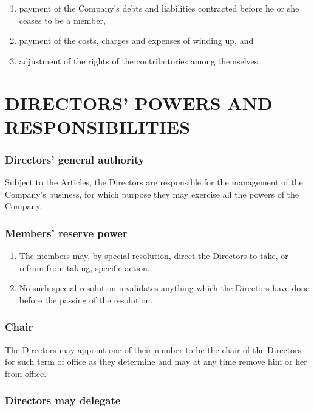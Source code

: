 \documentclass[a4paper,12pt]{article}
\begin{document}
\begin{enumerate}
  \item payment of the Company's debts and liabilities contracted before he or she ceases to be a member,
  \item payment of the costs, charges and expenses of winding up, and
  \item adjustment of the rights of the contributories among themselves.
\end{enumerate}

\part*{DIRECTORS' POWERS AND RESPONSIBILITIES}

\section{Directors' general authority}

Subject to the Articles, the Directors are responsible for the management of the Company's business, for which purpose they may exercise all the powers of the Company.

\section{Members' reserve power}

\begin{enumerate}
  \item The members may, by special resolution, direct the Directors to take, or refrain from taking, specific action.
  \item No such special resolution invalidates anything which the Directors have done before the passing of the resolution.
\end{enumerate}

\section{Chair}

The Directors may appoint one of their number to be the chair of the Directors for such term of office as they determine and may at any time remove him or her from office.

\section{Directors may delegate}
\end{document}
